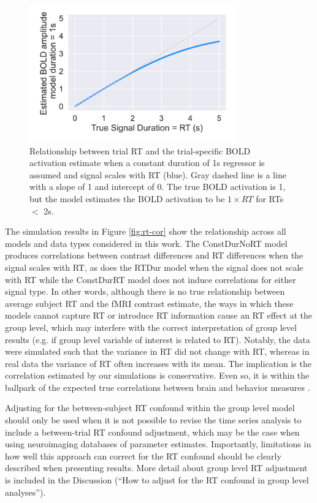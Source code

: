 \documentclass[titlepage,12pt] {article}
\begin{document}
\begin{figure}
  \centering
   \includegraphics[width=3.5in]{Figures/bold_fcn_rt_1sdur_only.pdf}
   \caption{Relationship between trial RT and the trial-specific BOLD activation estimate when a constant duration of 1s regressor is assumed and signal scales with RT (blue).  Gray dashed line is a line with a slope of 1 and intercept of 0.  The true BOLD activation is 1, but the model estimates the BOLD activation to be $1\times RT$ for RTs $<$ 2s.}
  \label{fig:bold_rt}
\end{figure}


The simulation results in Figure \ref{fig:rt-cor} show the relationship across all models and data types considered in this work. The ConstDurNoRT model produces correlations between contrast differences and RT differences when the signal scales with RT, as does the RTDur model when the signal does not scale with RT while the ConstDurRT model does not induce correlations for either signal type.  In other words, although there is no true relationship between average subject RT and the fMRI contrast estimate, the ways in which these models cannot capture RT or introduce RT information cause an RT effect at the group level, which may interfere with the correct interpretation of group level results (e.g. if group level variable of interest is related to RT).  Notably, the data were simulated such that the variance in RT did not change with RT, whereas in real data the variance of RT often increases with its mean.  The implication is the correlation estimated by our simulations is conservative.  Even so, it is within the ballpark of the expected true correlations between brain and behavior measures \citep{marekReproducibleBrainwideAssociation2022}.  

Adjusting for the between-subject RT confound within the group level model should only be used when it is not possible to revise the time series analysis to include a between-trial RT confound adjustment, which may be the case when using neuroimaging databases of parameter estimates.  Importantly, limitations in how well this approach can correct for the RT confound should be clearly described when presenting results.  More detail about group level RT adjustment is included in the Discussion (``How to adjust for the RT confound in group level analyses'').  
\end{document}

